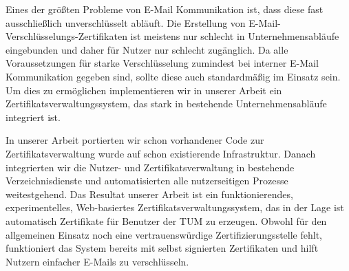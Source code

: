 \small

Eines der größten Probleme von E-Mail Kommunikation ist, dass diese fast ausschließlich unverschlüsselt abläuft.
Die Erstellung von E-Mail-Verschlüsselungs-Zertifikaten ist meistens nur schlecht in Unternehmensabläufe eingebunden und
daher für Nutzer nur schlecht zugänglich.
Da alle Voraussetzungen für starke Verschlüsselung zumindest bei interner E-Mail Kommunikation gegeben sind, sollte
diese auch standardmäßig im Einsatz sein.
Um dies zu ermöglichen implementieren wir in unserer Arbeit ein Zertifikatsverwaltungssystem, das stark in bestehende
Unternehmensabläufe integriert ist.

In unserer Arbeit portierten wir schon vorhandener Code zur Zertifikatsverwaltung wurde auf schon existierende
Infrastruktur.
Danach integrierten wir die Nutzer- und Zertifikatsverwaltung in bestehende Verzeichnisdienste und automatisierten alle
nutzerseitigen Prozesse weitestgehend.
Das Resultat unserer Arbeit ist ein funktionierendes, experimentelles, Web-basiertes Zertifikatsverwaltungssystem, das
in der Lage ist automatisch Zertifikate für Benutzer der TUM zu erzeugen.
Obwohl für den allgemeinen Einsatz noch eine vertrauenswürdige Zertifizierungsstelle fehlt, funktioniert das System
bereits mit selbst signierten Zertifikaten und hilft Nutzern einfacher E-Mails zu verschlüsseln.
